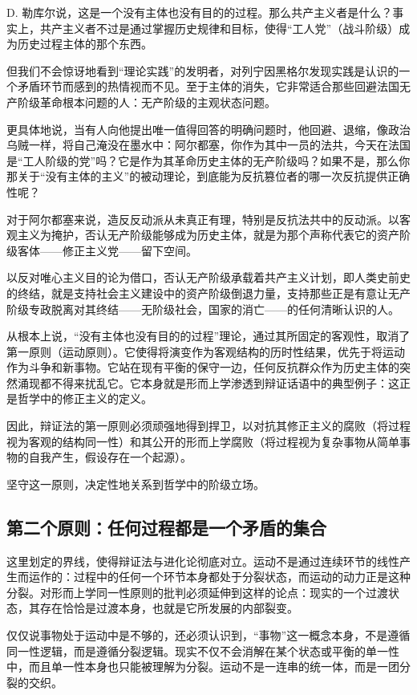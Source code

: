 \documentclass[fontset=fandol, a4paper, 12pt, twoside]{ctexart}
\begin{document}
D. 勒库尔说，这是一个没有主体也没有目的的过程。那么共产主义者是什么？事实上，共产主义者不过是通过掌握历史规律和目标，使得“工人党”（战斗阶级）成为历史过程主体的那个东西。

但我们不会惊讶地看到“理论实践”的发明者，对列宁因黑格尔发现实践是认识的一个矛盾环节而感到的热情视而不见。至于主体的消失，它非常适合那些回避法国无产阶级革命根本问题的人：无产阶级的主观状态问题。

更具体地说，当有人向他提出唯一值得回答的明确问题时，他回避、退缩，像政治乌贼一样，将自己淹没在墨水中：阿尔都塞，你作为其中一员的法共，今天在法国是“工人阶级的党”吗？它是作为其革命历史主体的无产阶级吗？如果不是，那么你那关于“没有主体的主义”的被动理论，到底能为反抗篡位者的哪一次反抗提供正确性呢？

对于阿尔都塞来说，造反反动派从未真正有理，特别是反抗法共中的反动派。以客观主义为掩护，否认无产阶级能够成为历史主体，就是为那个声称代表它的资产阶级客体——修正主义党——留下空间。

以反对唯心主义目的论为借口，否认无产阶级承载着共产主义计划，即人类史前史的终结，就是支持社会主义建设中的资产阶级倒退力量，支持那些正是有意让无产阶级专政脱离对其终结——无阶级社会，国家的消亡——的任何清晰认识的人。

从根本上说，“没有主体也没有目的的过程”理论，通过其所固定的客观性，取消了第一原则（运动原则）。它使得将演变作为客观结构的历时性结果，优先于将运动作为斗争和新事物。它站在现有平衡的保守一边，任何反抗群众作为历史主体的突然涌现都不得来扰乱它。它本身就是形而上学渗透到辩证话语中的典型例子：这正是哲学中的修正主义的定义。

因此，辩证法的第一原则必须顽强地得到捍卫，以对抗其修正主义的腐败（将过程视为客观的结构同一性）和其公开的形而上学腐败（将过程视为复杂事物从简单事物的自我产生，假设存在一个起源）。

坚守这一原则，决定性地关系到哲学中的阶级立场。

\subsection{第二个原则：任何过程都是一个矛盾的集合}

这里划定的界线，使得辩证法与进化论彻底对立。运动不是通过连续环节的线性产生而运作的：过程中的任何一个环节本身都处于分裂状态，而运动的动力正是这种分裂。对形而上学同一性原则的批判必须延伸到这样的论点：现实的一个过渡状态，其存在恰恰是过渡本身，也就是它所发展的内部裂变。

仅仅说事物处于运动中是不够的，还必须认识到，“事物”这一概念本身，不是遵循同一性逻辑，而是遵循分裂逻辑。现实不仅不会消解在某个状态或平衡的单一性中，而且单一性本身也只能被理解为分裂。运动不是一连串的统一体，而是一团分裂的交织。
\end{document}
